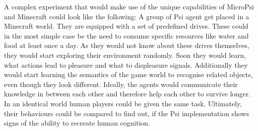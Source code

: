 A complex experiment that would make use of the unique capabilities of MicroPsi and Minecraft could look like the following:
A group of Psi agent get placed in a Minecraft world. They are equipped with a set of predefined drives. These could in the most simple case be the need to consume specific resources like water and food at least once a day. As they would not know about these drives themselves, they would start exploring their environment randomly. Soon they would learn, what actions lead to pleasure and what to displeasure signals. Additionally they would start learning the semantics of the game world to recognise related objects, even though they look different. Ideally, the agents would communicate their knowledge in between each other and therefore help each other to survive longer. In an identical world human players could be given the same task. Ultimately, their behaviours could be compared to find out, if the Psi implementation shows signs of the ability to recreate human cognition.